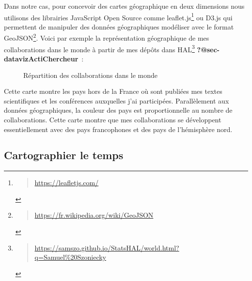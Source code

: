 \documentclass[
  a4paper,
  DIV=11,
  numbers=noendperiod]{scrreprt}
\begin{document}
Dans notre cas, pour concevoir des cartes géographique en deux
dimensions nous utilisons des librairies JavaScript Open Source comme
leaflet.js\footnote{\begin{quote}
  \url{https://leafletjs.com/}
  \end{quote}} ou D3.js qui permettent de manipuler des données
géographiques modéliser avec le format GeoJSON\footnote{\begin{quote}
  \url{https://fr.wikipedia.org/wiki/GeoJSON}
  \end{quote}}. Voici par exemple la représentation géographique de mes
collaborations dans le monde à partir de mes dépôts dans HAL\footnote{\begin{quote}
  \url{https://samszo.github.io/StatsHAL/world.html?q=Samuel\%20Szoniecky}
  \end{quote}} \textbf{?@sec-datavizActiChercheur}~:

\begin{figure}


\caption{\label{fig-collabMondeSamszo}Répartition des collaborations
dans le monde}

\end{figure}%

Cette carte montre les pays hors de la France où sont publiées mes
textes scientifiques et les conférences auxquelles j'ai participées.
Parallèlement aux données géographiques, la couleur des pays est
proportionnelle au nombre de collaborations. Cette carte montre que mes
collaborations se développent essentiellement avec des pays francophones
et des pays de l'hémisphère nord.

\subsection{Cartographier le temps}\label{sec-cartoTempo}
\end{document}
